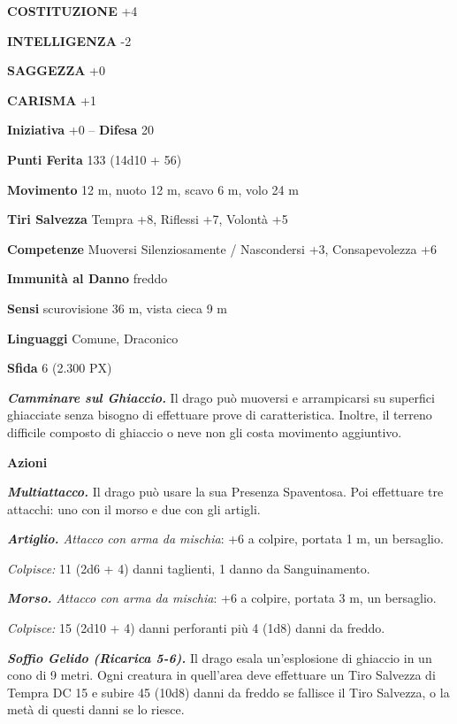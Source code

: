 \begin{multicols}{2}
	\textbf{COSTITUZIONE} +4

	\textbf{INTELLIGENZA} -2

	\textbf{SAGGEZZA} +0

	\textbf{CARISMA} +1

	\textbf{Iniziativa} +0 -- \textbf{Difesa} 20

	\textbf{Punti Ferita} 133 (14d10 + 56)

	\textbf{Movimento} 12 m, nuoto 12 m, scavo 6 m, volo 24 m

	\textbf{Tiri Salvezza} Tempra +8, Riflessi +7, Volontà +5

	\textbf{Competenze} Muoversi Silenziosamente / Nascondersi +3, Consapevolezza +6

	\textbf{Immunità al Danno} freddo

	\textbf{Sensi} scurovisione 36 m, vista cieca 9 m

	\textbf{Linguaggi} Comune, Draconico

	\textbf{Sfida} 6 (2.300 PX)

	\textit{\textbf{Camminare sul Ghiaccio.}} Il drago può muoversi e arrampicarsi su superfici ghiacciate senza bisogno di effettuare prove di caratteristica. Inoltre, il terreno difficile composto di ghiaccio o neve non gli costa movimento aggiuntivo.

	\textbf{Azioni}

	\textit{\textbf{Multiattacco.}} Il drago può usare la sua Presenza Spaventosa. Poi effettuare tre attacchi: uno con il morso e due con gli artigli.

	\textit{\textbf{Artiglio.} Attacco con arma da mischia}: +6 a colpire, portata 1 m, un bersaglio.

	\textit{Colpisce:} 11 (2d6 + 4) danni taglienti, 1 danno da Sanguinamento.

	\textit{\textbf{Morso.} Attacco con arma da mischia}: +6 a colpire, portata 3 m, un bersaglio.

	\textit{Colpisce:} 15 (2d10 + 4) danni perforanti più 4 (1d8) danni da freddo.

	\textit{\textbf{Soffio Gelido (Ricarica 5-6).}} Il drago esala un'esplosione di ghiaccio in un cono di 9 metri. Ogni creatura in quell'area deve effettuare un Tiro Salvezza di Tempra DC 15 e subire 45 (10d8) danni da freddo se fallisce il Tiro Salvezza, o la metà di questi danni se lo riesce.


\end{multicols}
